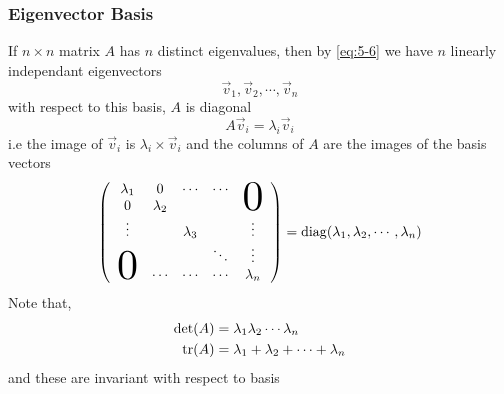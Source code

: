 \documentclass{article}
\numberwithin{equation}{section}
\begin{document}
\subsubsection{Eigenvector Basis}
If $n \times n$ matrix $A$ has $n$ distinct eigenvalues, then by \eqref{eq:5-6} we have $n$ linearly independant eigenvectors
\[
    \vec v_1, \vec v_2, \cdots, \vec v_n
\]
with respect to this basis, $A$ is diagonal
\[
    A \vec v_i = \lambda_i \vec v_i
\]
i.e the image of $\vec v_i$ is $\lambda_i \times \vec v_i$ and the columns of $A$ are the images of the basis vectors
\begin{equation}\label{eq:5-7}
    \bkt{\begin{array}{ccccc}
        \lambda_1              & 0         & \cdots    & \cdots &  \\
        0                      & \lambda_2 &           &        &\smash{\scalebox{3}{0}} \\
        \vdots                 &           & \lambda_3 &        & \vdots \\
                               &           &           & \ddots & \vdots  \\
        \smash{\scalebox{3}{0}}& \cdots    & \cdots    & \cdots & \lambda_n
    \end{array}} = \diag(\lambda_1, \lambda_2, \cdots, \lambda_n)
\end{equation}
Note that,
\begin{align*}
    \det(A) &= \lambda_1 \lambda_2 \cdots \lambda_n \\
    \operatorname{tr}(A) &= \lambda_1 + \lambda_2 + \cdots + \lambda_n
\end{align*}
and these are invariant with respect to basis
\end{document}
